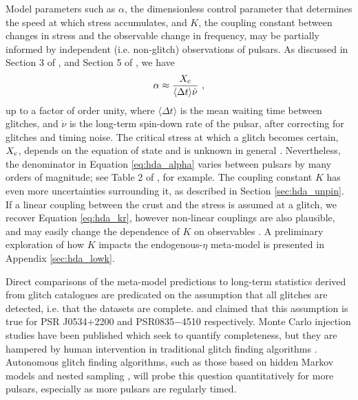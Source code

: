 Model parameters such as $\alpha$, the dimensionless control parameter that determines the speed at which stress accumulates, and $K$, the coupling constant between changes in stress and the observable change in frequency, may be partially informed by independent (i.e. non-glitch) observations of pulsars. As discussed in Section 3 of \citet{Melatos2018}, and Section 5 of \citet{Carlin2020bsa}, we have \begin{align}
\alpha \approx \frac{X_\textrm{c}}{\langle\Delta t \rangle \dot{\nu}}\ , \label{eq:hda_alpha}
\end{align}
up to a factor of order unity, where $\langle\Delta t \rangle$ is the mean waiting time between glitches, and $\dot{\nu}$ is the long-term spin-down rate of the pulsar, after correcting for glitches and timing noise. The critical stress at which a glitch becomes certain, $X_\textrm{c}$, depends on the equation of state and is unknown in general \citep{Link1991, Donati2006}. Nevertheless, the denominator in Equation \eqref{eq:hda_alpha} varies between pulsars by many orders of magnitude; see Table 2 of \citet{Melatos2018}, for example. The coupling constant $K$ has even more uncertainties surrounding it, as described in Section \ref{sec:hda_unpin}. If a linear coupling between the crust and the stress is assumed at a glitch, we recover Equation \eqref{eq:hda_kr}, however non-linear couplings are also plausible, and may easily change the dependence of $K$ on observables \citep{Gugercinoglu2019, Pizzochero2020, Celora2020}. A preliminary exploration of how $K$ impacts the endogenous-$\eta$ meta-model is presented in Appendix \ref{sec:hda_lowk}. 

Direct comparisons of the meta-model predictions to long-term statistics derived from glitch catalogues are predicated on the assumption that all glitches are detected, i.e. that the datasets are complete. \citet{Espinoza2014} and \citet{Espinoza2021} claimed that this assumption is true for PSR J0534$+$2200 and PSR0835$-$4510 respectively. Monte Carlo injection studies have been published which seek to quantify completeness, but they are hampered by human intervention in traditional glitch finding algorithms \citep{Janssen2006, Yu2017b}. Autonomous glitch finding algorithms, such as those based on hidden Markov models \citep{Melatos2020hmm} and nested sampling \citep{Shannon2016, Jankowski2019, Lower2020}, will probe this question quantitatively for more pulsars, especially as more pulsars are regularly timed.

